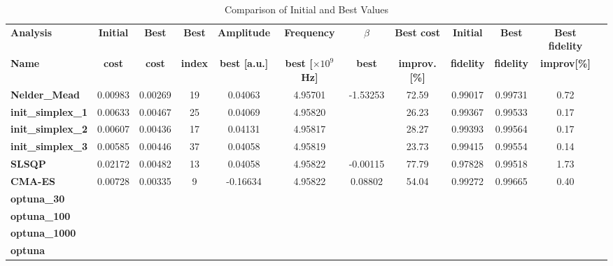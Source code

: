 \begin{table}
    \centering
    \begin{tabular}{lccccccccccc}
        \toprule
        \textbf{Analysis} & \textbf{Initial} & \textbf{Best} & \textbf{Best} & \textbf{Amplitude} & \textbf{Frequency} & \textbf{$\beta$} & \textbf{Best cost} & \textbf{Initial} & \textbf{Best} & \textbf{Best fidelity} \\
        \textbf{Name} & \textbf{cost} & \textbf{cost} & \textbf{index} & \textbf{best [a.u.]} & \textbf{ best [$\times10^9$ Hz]} & \textbf{best} & \textbf{improv. [\%]} & \textbf{fidelity} & \textbf{fidelity} & \textbf{improv[\%]} \\
        \midrule
        \textbf{Nelder\_Mead} & 0.00983 & 0.00269 & 19 & 0.04063 & 4.95701 & -1.53253 & 72.59 & 0.99017 & 0.99731 & 0.72 \\
        \textbf{init\_simplex\_1} & 0.00633 & 0.00467 & 25 & 0.04069 & 4.95820 &  & 26.23 & 0.99367 & 0.99533 & 0.17 \\
        \textbf{init\_simplex\_2} & 0.00607 & 0.00436 & 17 & 0.04131 & 4.95817 &  & 28.27 & 0.99393 & 0.99564 & 0.17 \\
        \textbf{init\_simplex\_3} & 0.00585 & 0.00446 & 37 & 0.04058 & 4.95819 &  & 23.73 & 0.99415 & 0.99554 & 0.14 \\
        \textbf{SLSQP} & 0.02172 & 0.00482 & 13 & 0.04058 & 4.95822 & -0.00115 & 77.79 & 0.97828 & 0.99518 & 1.73 \\
        \textbf{CMA-ES} & 0.00728 & 0.00335 & 9 & -0.16634 & 4.95822 & 0.08802 & 54.04 & 0.99272 & 0.99665 & 0.40 \\
        \textbf{optuna\_30} & & & & & & & & & & \\
        \textbf{optuna\_100} & & & & & & & & & & \\
        \textbf{optuna\_1000} & & & & & & & & & & \\
        \textbf{optuna} & & & & & & & & & & \\
        \bottomrule
    \end{tabular}
    \caption{Comparison of Initial and Best Values}
    \label{tab:best_values}
\end{table}

